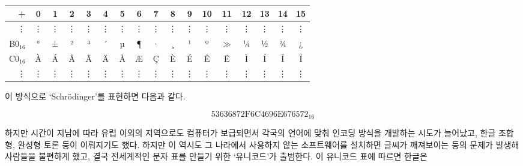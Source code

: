 \documentclass{article}
\begin{document}
\begin{center}
    \begin{tabular}{r|cccccccccccccccc}
        + & 0 & 1 & 2 & 3 & 4 & 5 & 6 & 7 & 8 & 9 & 10 & 11 & 12 & 13 & 14 & 15 \\
        \hline
        \vdots & \vdots & \vdots & \vdots & \vdots & \vdots & \vdots & \vdots & \vdots & \vdots & \vdots & \vdots & \vdots & \vdots & \vdots & \vdots & \vdots \\
        $\text{B0}_{16}$ & ° & ± & ² & ³ & ´ & µ & ¶ & · & ¸ & ¹ & º & $\gg$ & ¼ & ½ & ¾ & ¿ \\
        $\text{C0}_{16}$ & À & Á & Â & Ã & Ä & Å & Æ & Ç & È & É & Ê & Ë & Ì & Í & Î & Ï \\
        \vdots & \vdots & \vdots & \vdots & \vdots & \vdots & \vdots & \vdots & \vdots & \vdots & \vdots & \vdots & \vdots & \vdots & \vdots & \vdots & \vdots
    \end{tabular}
\end{center}

이 방식으로 `Schrödinger'를 표현하면 다음과 같다.

$$
\text{53636872F6C4696E676572}_{16}
$$

하지만 시간이 지남에 따라 유럽 이외의 지역으로도 컴퓨터가 보급되면서 각국의 언어에 맞춰 인코딩
방식을 개발하는 시도가 늘어났고, 한글 조합형, 완성형 토론 등이 이뤄지기도 했다.
하지만 이 역시도 그 나라에서 사용하지 않는 소프트웨어를 설치하면 글씨가 깨져보이는 등의 문제가
발생해 사람들을 불편하게 했고, 결국 전세계적인 문자 표를 만들기 위한 `유니코드'가 출범한다.
이 유니코드 표에 따르면 한글은
\end{document}
